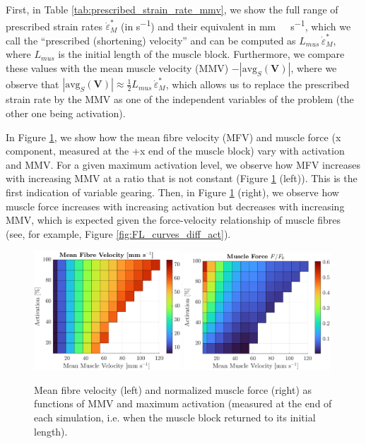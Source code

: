 \documentclass{sfuthesis}
\numberwithin{equation}{section}
\numberwithin{figure}{chapter}
\numberwithin{table}{chapter}
\theoremstyle{definition}
\def\*#1{{\mathbf{#1}}} %
\newcommand{\depsilon}{\dot{\varepsilon}}
\begin{document}
First, in Table \ref{tab:prescribed_strain_rate_mmv}, we show the full range of prescribed strain rates $\depsilon_M^*$ (in \unit{s^{-1}}) and their equivalent in \unit{mm \ s^{-1}}, which we call the ``prescribed (shortening) velocity'' and can be computed as $L_{mus} \, \depsilon_M^*$, where $L_{mus}$ is the initial length of the muscle block. Furthermore, we compare these values with the mean muscle velocity (MMV) $-|\mathrm{avg}_S(\*V)|$, where we observe that  $|\mathrm{avg}_S(\*V)| \approx \frac{1}{2} L_{mus} \, \depsilon_M^*$, which allows us to replace the prescribed strain rate by the MMV as one of the independent variables of the problem (the other one being activation).

In Figure \ref{fig:g_mfv_force}, we show how the mean fibre velocity (MFV) and muscle force (x component, measured at the +x end of the muscle block) vary with activation and MMV. For a given maximum activation level, we observe how MFV increases with increasing MMV at a ratio that is not constant (Figure \ref{fig:g_mfv_force} (left)). This is the first indication of variable gearing. Then, in Figure \ref{fig:g_mfv_force} (right), we observe how muscle force increases with increasing activation but decreases with increasing MMV, which is expected given the force-velocity relationship of muscle fibres (see, for example, Figure \ref{fig:FL_curves_diff_act}). 

\begin{figure}
    \centering
    \includegraphics[width=0.49\textwidth]{01_vmuscle_activation_vfibre.eps}
    \includegraphics[width=0.49\textwidth]{02_vmuscle_activation_force.eps}
    \caption{Mean fibre velocity (left) and normalized muscle force (right) as functions of MMV and maximum activation (measured at the end of each simulation, i.e. when the muscle block returned to its initial length).
    \label{fig:g_mfv_force}}
\end{figure}
\end{document}
